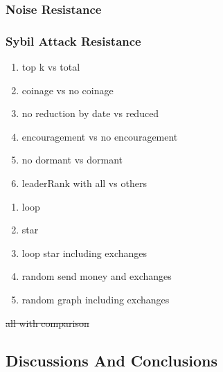 \subsubsection{Noise Resistance}
\subsubsection{Sybil Attack Resistance}
\begin{enumerate}
\item top k vs total
\item coinage vs no coinage
\item no reduction by date vs reduced
\item encouragement vs no encouragement
\item no dormant vs dormant
\item leaderRank with all vs others
\end{enumerate}
\begin{enumerate}
	\item loop
	\item star
	\item loop star including exchanges
	\item random send money and exchanges
	\item random graph including exchanges
\end{enumerate}

\st{all with comparison}

\subsection{Discussions And Conclusions} \label{sec:discuss}
